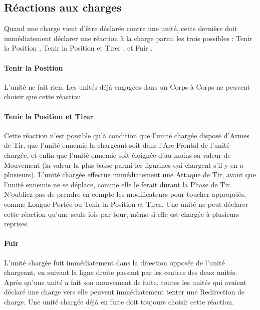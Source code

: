 \newpage
\subsection{Réactions aux charges}

Quand une charge vient d'être déclarée contre une unité, cette dernière doit immédiatement déclarer une réaction à la charge parmi les trois possibles : \og Tenir la Position \fg{}, \og Tenir la Position et Tirer \fg{}, et \og Fuir \fg{}.

\paragraph{Tenir la Position}

L'unité ne fait rien. Les unités déjà engagées dans un Corps à Corps ne peuvent choisir que cette réaction.

\paragraph{Tenir la Position et Tirer}

Cette réaction n'est possible qu'à condition que l'unité chargée dispose d'Armes de Tir, que l'unité ennemie la chargeant soit dans l'Arc Frontal de l'unité chargée, et enfin que l'unité ennemie soit éloignée d'au moins sa valeur de Mouvement (la valeur la plus basse parmi les figurines qui chargent s'il y en a plusieurs). L'unité chargée effectue immédiatement une Attaque de Tir, avant que l'unité ennemie ne se déplace, comme elle le ferait durant la Phase de Tir. N'oubliez pas de prendre en compte les modificateurs pour toucher appropriés, comme Longue Portée ou Tenir la Position et Tirer. Une unité ne peut déclarer cette réaction qu'une seule fois par tour, même si elle est chargée à plusieurs reprises.

\paragraph{Fuir}

L'unité chargée fuit immédiatement dans la direction opposée de l'unité chargeant, en suivant la ligne droite passant par les centres des deux unités. Après qu'une unité a fait son mouvement de fuite, toutes les unités qui avaient déclaré une charge vers elle peuvent immédiatement tenter une Redirection de charge. Une unité chargée déjà en fuite doit toujours choisir cette réaction.

